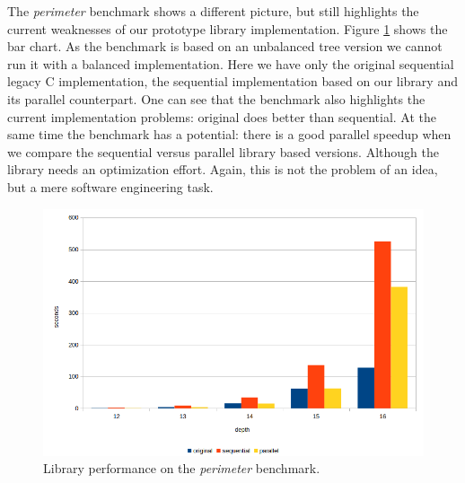 \quad The \textit{perimeter} benchmark shows a different picture, but still highlights the current weaknesses of our prototype library implementation. Figure \ref{fig:performance_perimeter} shows the bar chart. As the benchmark is based on an unbalanced tree version we cannot run it with a balanced implementation. Here we have only the original sequential legacy C implementation, the sequential implementation based on our library and its parallel counterpart. One can see that the benchmark also highlights the current implementation problems: original does better than sequential. At the same time the benchmark has a potential: there is a good parallel speedup when we compare the sequential versus parallel library based versions. Although the library needs an optimization effort. Again, this is not the problem of an idea, but a mere software engineering task.
\begin{figure}[!htb]
\includegraphics[width=1.0\textwidth]{images/perimeter.png}
\caption{Library performance on the \textit{perimeter} benchmark.}
\label{fig:performance_perimeter}
\end{figure}

